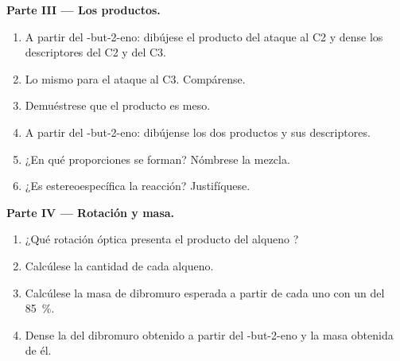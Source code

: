 \begin{problem}
\medskip
\noindent\textbf{Parte III --- Los productos.}
\begin{enumerate}[resume]
  \item A partir del -but-2-eno: dibújese el producto del ataque al
        C2 y dense los descriptores del C2 y del C3.
  \item Lo mismo para el ataque al C3. Compárense.
  \item Demuéstrese que el producto es meso.
  \item A partir del -but-2-eno: dibújense los dos productos y sus
        descriptores.
  \item ¿En qué proporciones se forman? Nómbrese la mezcla.
  \item ¿Es estereoespecífica la reacción? Justifíquese.
\end{enumerate}

\medskip
\noindent\textbf{Parte IV --- Rotación y masa.}
\begin{enumerate}[resume]
  \item ¿Qué rotación óptica presenta el producto del alqueno ?
  \item Calcúlese la cantidad de cada alqueno.
  \item Calcúlese la masa de dibromuro esperada a partir de cada uno con
        un  del \qty{85}{\percent}.
  \item Dense la  del dibromuro obtenido a partir del
        -but-2-eno y la masa obtenida de él.
\end{enumerate}
\end{problem}
